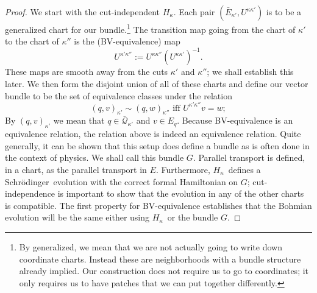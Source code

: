 \documentclass[11pt]{article}
\theoremstyle{remark}
\begin{document}
\begin{proof}

We start with the cut-independent \ensuremath{H_{\ensuremath{\kappa}}}. 
Each pair $(\ensuremath{\bar{E}_{{\ensuremath{\kappa'}}}}, \ensuremath{U^{\ensuremath{\kappa}{}  \ensuremath{\kappa}{'}}})$ is to be a generalized chart for our
bundle.\footnote{By generalized, we mean that we are not actually
going to write down coordinate charts. Instead these are neighborhoods
with a bundle structure already implied. Our construction does not
require us to go to coordinates; it only requires us to have patches
that we can put together differently.} The transition
map  going from the chart of $\ensuremath{\kappa}'$ to the chart of $\ensuremath{\kappa}''$ is the
(BV-equivalence) map 
\[
\ensuremath{U^{\ensuremath{\kappa}{'}  \ensuremath{\kappa}{''}}} \ensuremath{:=} \ensuremath{U^{\ensuremath{\kappa}{}  \ensuremath{\kappa}{''}}}(\ensuremath{U^{\ensuremath{\kappa}{}  \ensuremath{\kappa}{'}}})^{-1} .
\] These maps are smooth away from
the cuts $\ensuremath{\kappa}'$ and $\ensuremath{\kappa}''$; we shall establish this later. 
We then form the disjoint union of all of these charts and define our vector
bundle to 
 be the set of equivalence classes under the relation
\begin{equation} \label{ei:eqvr}
(\ensuremath{q}, v)_{\ensuremath{\kappa}'} \ensuremath{\sim} (\ensuremath{q}, w)_{\ensuremath{\kappa}''} \text{ iff }
\ensuremath{U^{\ensuremath{\kappa}{'}  \ensuremath{\kappa}{''}}} v = w;
\end{equation}
By $(\ensuremath{q}, v)_{\ensuremath{\kappa}'}$ we mean that $\ensuremath{q} \in \ensuremath{\bar{\ensuremath{\mathcal{Q}}}_{{\ensuremath{\kappa'}}}}$
and $v \in E_{\ensuremath{q}}$. 
Because  BV-equivalence is an equivalence relation, the relation above
is indeed an equivalence relation.
Quite generally, 
it can be shown that this setup does define a bundle as is often done
in the context of physics. We shall call this bundle $G$. 
Parallel transport is defined, in a chart, as  the 
parallel transport in $E$.
Furthermore, \ensuremath{H_{\ensuremath{\kappa}}}\  defines a Schr\"odinger\ evolution
with the correct formal Hamiltonian on $G$; cut-independence is
important to show that the evolution in any of the other charts is
compatible. The first property for BV-equivalence establishes
that the Bohmian evolution will be the same either using \ensuremath{H_{\ensuremath{\kappa}}}\ or the
bundle $G$.  


\end{proof}
\end{document}
